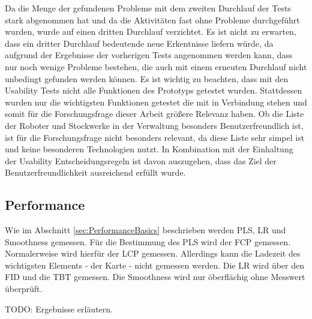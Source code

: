 Da die Menge der gefundenen Probleme mit dem zweiten Durchlauf der Tests stark abgenommen hat und da die Aktivitäten fast ohne Probleme durchgeführt wurden, wurde auf einen dritten Durchlauf verzichtet. Es ist nicht zu erwarten, dass ein dritter Durchlauf bedeutende neue Erkentnisse liefern würde, da aufgrund der Ergebnisse der vorherigen Tests angenommen werden kann, dass nur noch wenige Probleme bestehen, die auch mit einem erneuten Durchlauf nicht unbedingt gefunden werden können. Es ist wichtig zu beachten, dass mit den Usability Tests nicht alle Funktionen des Prototyps getestet wurden. Stattdessen wurden nur die wichtigsten Funktionen getestet die mit \deckgl{} in Verbindung stehen und somit für die Forschungsfrage dieser Arbeit größere Relevanz haben. Ob die Liste der Roboter und Stockwerke in der Verwaltung besonders Benutzerfreundlich ist, ist für die Forschungsfrage nicht besonders relevant, da diese Liste sehr simpel ist und keine besonderen Technologien nutzt. In Kombination mit der Einhaltung der Usability Entscheidungsregeln ist davon auszugehen, dass das Ziel der Benutzerfreundlichkeit ausreichend erfüllt wurde.

\subsection{Performance}
Wie im Abschnitt \ref{sec:PerformanceBasics} beschrieben werden \ac{PLS}, \ac{LR} und Smoothness gemessen. Für die Bestimmung des \ac{PLS} wird der \ac{FCP} gemessen. Normalerweise wird hierfür der \ac{LCP} gemessen. Allerdings kann die Ladezeit des wichtigsten Elements - der \deckgl{} Karte - nicht gemessen werden. Die \ac{LR} wird über den \ac{FID} und die \ac{TBT} gemessen. Die Smoothness wird nur öberflächig ohne Messwert überprüft.

TODO: Ergebnisse erläutern.





